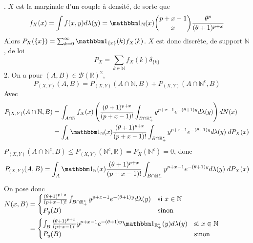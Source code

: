 \documentclass{report}
\begin{document}
\subsection{} \noindent{}\\ 
\\ 
\\
. $X$ est la marginale d'un couple à densité, de sorte que $$f_X(x)=\int f(x,y)d\lambda(y) = \mathbbm 1_{\mathbb N}(x)\binom{p+x-1}{x}\frac{\theta^p}{(\theta+1)^{p+x}}$$
Alors $P_X(\{x\})=\sum_{k=0}^\infty \mathbbm 1_{\{x\}}(k)f_X(k) $. $X$ est donc discrète, de support $\mathbb N$, de loi $$P_X = \sum_{k\in \mathbb N} f_X(k) \delta_{\{k\}}$$
2. On a pour $(A,B)\in \mathcal B(\mathbb R)^2$, 
$$
P_{(X,Y)}(A,B) = P_{(X,Y)}(A\cap \mathbb N,B) + P_{(X,Y)}(A\cap \mathbb N^c,B)$$
Avec
$$\begin{aligned}P_{(X,Y)}(A\cap \mathbb N,B)&= \int_{A\cap \mathbb N}f_X(x) \left(\frac{(\theta+1)^{p+x}}{(p+x-1)!} \int_{B\cap \mathbb R_+^*} y^{p+x-1}e^{-(\theta+1)y} d\lambda(y)\right) dN(x)  \\
&=\int_A \mathbbm 1_{\mathbb N}(x) \frac{(\theta+1)^{p+x}}{(p+x-1)!} \int_{B\cap \mathbb R_+^*} y^{p+x-1}e^{-(\theta+1)y} d\lambda(y) \;dP_X(x)
\end{aligned}$$
$P_{(X,Y)}(A\cap \mathbb N^c,B) \leq P_{(X,Y)}(\mathbb N^c,\mathbb R) = P_{X}(\mathbb N^c)=0$, donc 
$$ P_{(X,Y)}(A,B) = \int_A \mathbbm 1_{\mathbb N}(x) \frac{(\theta+1)^{p+x}}{(p+x-1)!} \int_{B\cap \mathbb R_+^*} y^{p+x-1}e^{-(\theta+1)y} d\lambda(y) \;dP_X(x)$$
On pose donc 
$\begin{aligned}[t] N(x,B)&=\begin{cases}
\frac{(\theta+1)^{p+x}}{(p+x-1)!} \int_{B\cap \mathbb R_+^*} y^{p+x-1}e^{-(\theta+1)y} d\lambda(y) & \text{si } x\in \mathbb N \\
P_y(B) & \text{sinon }
\end{cases}\\
&= \begin{cases}
\int_B \frac{(\theta+1)^{p+x}}{(p+x-1)!} y^{p+x-1}e^{-(\theta+1)y} \mathbbm 1_{\mathbb R_+^*}(y) d\lambda(y) & \text{si } x\in \mathbb N \\
P_y(B) & \text{sinon }
\end{cases}
\end{aligned}$\newline
\end{document}
